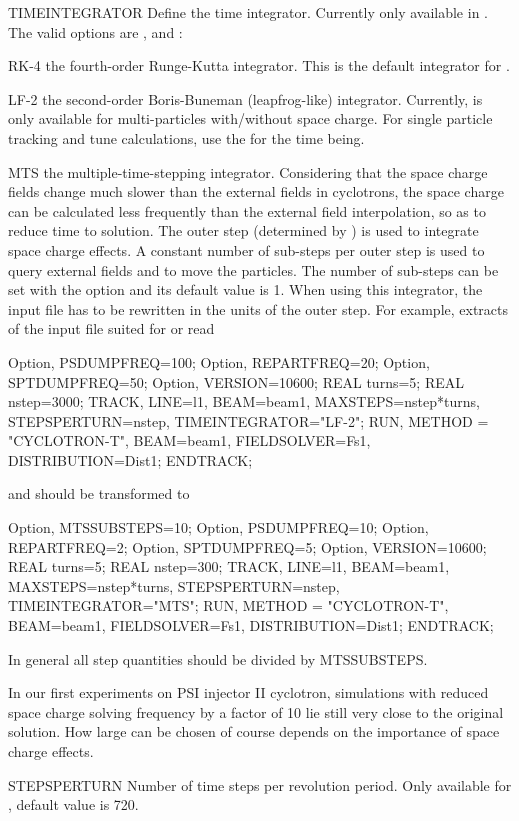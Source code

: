\begin{kdescription}
 \item[TIMEINTEGRATOR]
  Define the time integrator. Currently only available in \opalcycl.
  The valid options are ,  and :
  \begin{kdescription}
    \item[RK-4] the fourth-order Runge-Kutta integrator. This is the default integrator for \opalcycl.
    \item[LF-2] the second-order Boris-Buneman (leapfrog-like) integrator.
      Currently,  is only available for multi-particles with/without space charge.
      For single particle tracking and tune calculations, use the  for the time being.
    \item[MTS] the multiple-time-stepping integrator.
    Considering that the space charge fields change much slower than the external fields in cyclotrons,
    the space charge can be calculated less  frequently than the external field interpolation, so as to reduce time to solution.
    The outer step (determined by ) is used to integrate  space charge effects.
    A constant number of sub-steps per outer step is used to query external fields and to move the particles.
    The number of sub-steps can be set with the option  and its default value is 1.
    When using this integrator, the input file has to be rewritten in the units of the outer step.
   For example, extracts of the input file suited for
     or  read
\begin{example}
Option, PSDUMPFREQ=100;
Option, REPARTFREQ=20;
Option, SPTDUMPFREQ=50;
Option, VERSION=10600;
REAL turns=5;
REAL nstep=3000;
TRACK, LINE=l1, BEAM=beam1, MAXSTEPS=nstep*turns, STEPSPERTURN=nstep,
TIMEINTEGRATOR="LF-2";
    RUN, METHOD = "CYCLOTRON-T", BEAM=beam1, FIELDSOLVER=Fs1, DISTRIBUTION=Dist1;
ENDTRACK;
\end{example}
and should be transformed to
\begin{example}
Option, MTSSUBSTEPS=10;
Option, PSDUMPFREQ=10;
Option, REPARTFREQ=2;
Option, SPTDUMPFREQ=5;
Option, VERSION=10600;
REAL turns=5;
REAL nstep=300;
TRACK, LINE=l1, BEAM=beam1, MAXSTEPS=nstep*turns, STEPSPERTURN=nstep,
TIMEINTEGRATOR="MTS";
    RUN, METHOD = "CYCLOTRON-T", BEAM=beam1, FIELDSOLVER=Fs1, DISTRIBUTION=Dist1;
ENDTRACK;
\end{example}
In general all step quantities should be divided by MTSSUBSTEPS.

In our first experiments on PSI injector II cyclotron, simulations with reduced
space charge solving frequency by a factor of 10 lie still very close to the original solution.
How large  can be chosen of course depends on the importance of space charge effects.
  \end{kdescription}

\item[STEPSPERTURN]
  Number of time steps per revolution period. Only available for \opalcycl, default value is 720.

\end{kdescription}

